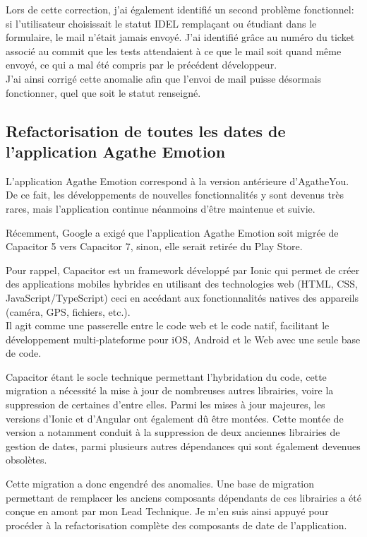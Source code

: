 \documentclass{article}
\begin{document}
Lors de cette correction, j'ai également identifié un second problème fonctionnel: si l'utilisateur choisissait le statut IDEL remplaçant ou étudiant dans le formulaire, le mail n'était jamais envoyé. J'ai identifié grâce au numéro du ticket associé au commit que les tests attendaient à ce que le mail soit quand même envoyé, ce qui a mal été compris par le précédent développeur. \\

J'ai ainsi corrigé cette anomalie afin que l'envoi de mail puisse désormais fonctionner, quel que soit le statut renseigné.

\subsection{ Refactorisation de toutes les dates de l'application Agathe Emotion}

L'application Agathe Emotion correspond à la version antérieure d'AgatheYou. De ce fait, les développements de nouvelles fonctionnalités y sont devenus très rares, mais l'application continue néanmoins d'être maintenue et suivie.

Récemment, Google a exigé que l'application Agathe Emotion soit migrée de Capacitor 5 vers Capacitor 7, sinon, elle serait retirée du Play Store.

Pour rappel, Capacitor est un framework développé par Ionic qui permet de créer des applications mobiles hybrides en utilisant des technologies web (HTML, CSS, JavaScript/TypeScript) ceci en accédant aux fonctionnalités natives des appareils (caméra, GPS, fichiers, etc.). \\
Il agit comme une passerelle entre le code web et le code natif, facilitant le développement multi-plateforme pour iOS, Android et le Web avec une seule base de code.

Capacitor étant le socle technique permettant l'hybridation du code, cette migration a nécessité la mise à jour de nombreuses autres librairies, voire la suppression de certaines d'entre elles. Parmi les mises à jour majeures, les versions d'Ionic et d'Angular ont également dû être montées. Cette montée de version a notamment conduit à la suppression de deux anciennes librairies de gestion de dates, parmi plusieurs autres dépendances qui sont également devenues obsolètes.

Cette migration a donc engendré des anomalies. Une base de migration permettant de remplacer les anciens composants dépendants de ces librairies a été conçue en amont par mon Lead Technique. Je m'en suis ainsi appuyé pour procéder à la refactorisation complète des composants de date de l'application.
\end{document}
